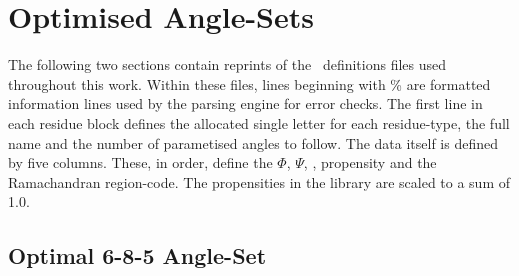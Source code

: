 \chapter{Optimised Angle-Sets}
\label{appendix:angleset}

The following two sections contain reprints of the \angleset\ definitions files used throughout this work.
Within these files, lines beginning with \% are formatted information lines used by the parsing engine for error checks. The first line in each residue block defines the allocated single letter for each residue-type, the full name and the number of parametised angles to follow. The data itself is defined by five columns. These, in order, define the $\Phi$, $\Psi$, \Omg, propensity and the Ramachandran region-code. The propensities in the library are scaled to a sum of 1.0.
 
\section{Optimal 6-8-5 Angle-Set}
\label{appendix:angleset:AngleSet685}

